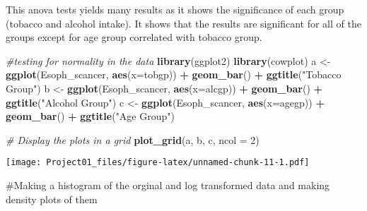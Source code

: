 \documentclass[
]{article}
\newenvironment{Shaded}{\begin{snugshade}}{\end{snugshade}}
\newcommand{\AttributeTok}[1]{\textcolor[rgb]{0.13,0.29,0.53}{#1}}
\newcommand{\CommentTok}[1]{\textcolor[rgb]{0.56,0.35,0.01}{\textit{#1}}}
\newcommand{\DecValTok}[1]{\textcolor[rgb]{0.00,0.00,0.81}{#1}}
\newcommand{\FunctionTok}[1]{\textcolor[rgb]{0.13,0.29,0.53}{\textbf{#1}}}
\newcommand{\NormalTok}[1]{#1}
\newcommand{\OtherTok}[1]{\textcolor[rgb]{0.56,0.35,0.01}{#1}}
\newcommand{\SpecialCharTok}[1]{\textcolor[rgb]{0.81,0.36,0.00}{\textbf{#1}}}
\newcommand{\StringTok}[1]{\textcolor[rgb]{0.31,0.60,0.02}{#1}}
\begin{document}
This anova tests yields many results as it shows the significance of
each group (tobacco and alcohol intake). It shows that the results are
significant for all of the groups except for age group correlated with
tobacco group.

\begin{Shaded}
\begin{Highlighting}[]
\CommentTok{\#testing for normality in the data}
\FunctionTok{library}\NormalTok{(ggplot2)}
\FunctionTok{library}\NormalTok{(cowplot)}
\NormalTok{a }\OtherTok{\textless{}{-}} \FunctionTok{ggplot}\NormalTok{(Esoph\_scancer, }\FunctionTok{aes}\NormalTok{(}\AttributeTok{x=}\NormalTok{tobgp)) }\SpecialCharTok{+} \FunctionTok{geom\_bar}\NormalTok{() }\SpecialCharTok{+} \FunctionTok{ggtitle}\NormalTok{(}\StringTok{"Tobacco Group"}\NormalTok{)}
\NormalTok{b }\OtherTok{\textless{}{-}} \FunctionTok{ggplot}\NormalTok{(Esoph\_scancer, }\FunctionTok{aes}\NormalTok{(}\AttributeTok{x=}\NormalTok{alcgp)) }\SpecialCharTok{+} \FunctionTok{geom\_bar}\NormalTok{() }\SpecialCharTok{+} \FunctionTok{ggtitle}\NormalTok{(}\StringTok{"Alcohol Group"}\NormalTok{)}
\NormalTok{c }\OtherTok{\textless{}{-}} \FunctionTok{ggplot}\NormalTok{(Esoph\_scancer, }\FunctionTok{aes}\NormalTok{(}\AttributeTok{x=}\NormalTok{agegp)) }\SpecialCharTok{+} \FunctionTok{geom\_bar}\NormalTok{() }\SpecialCharTok{+} \FunctionTok{ggtitle}\NormalTok{(}\StringTok{"Age Group"}\NormalTok{)}

\CommentTok{\# Display the plots in a grid}
\FunctionTok{plot\_grid}\NormalTok{(a, b, c, }\AttributeTok{ncol =} \DecValTok{2}\NormalTok{)}
\end{Highlighting}
\end{Shaded}

\texttt{[image: Project01\_files/figure-latex/unnamed-chunk-11-1.pdf]}

\#Making a histogram of the orginal and log transformed data and making
density plots of them
\end{document}
